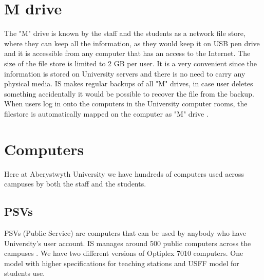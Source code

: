 \documentclass[10pt,a4paper,headinclude=true,twoside]{report}
\begin{document}
\section{M drive}
The "M" drive is known by the staff and the students as a network file store, where they can keep all the information, as they would keep it on USB pen drive and it is accessible from any computer that has an access to the Internet. The size of the file store is limited to 2 GB per user.  It is a very convenient since the information is stored on University servers and there is no need to carry any physical media. IS makes regular backups of all "M" drives, in case user deletes something accidentally it would be possible to recover the file from the backup. When users log in onto the computers in the University computer rooms, the filestore is automatically mapped on the computer as "M" drive \cite{MDrive}.

\section{Computers}
Here at Aberystwyth University we have hundreds of computers used across campuses by both the staff and the students. 
\subsection{PSVs}
PSVs (Public Service) are computers that can be used by anybody who have University's user account. IS manages around 500 public computers across the campuses \cite{PSVs2}. We have two different versions of Optiplex 7010 computers. One model with higher specifications for teaching stations and USFF model for students use. 
\end{document}
